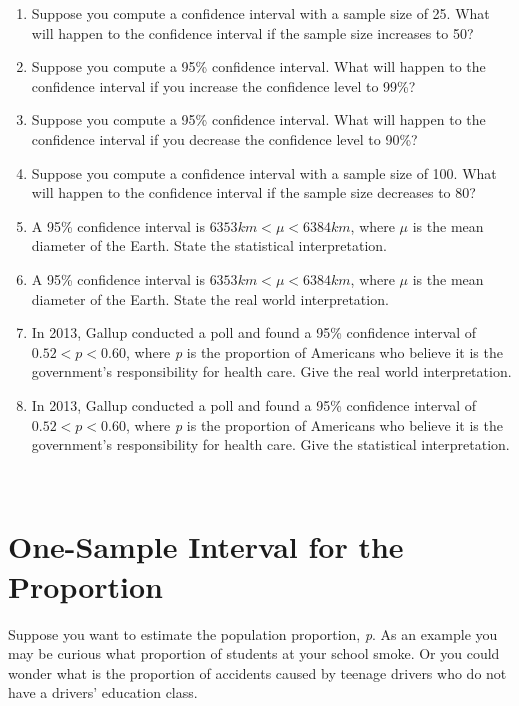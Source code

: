 \documentclass[]{book}
\begin{document}
\begin{enumerate}
\def\labelenumi{\arabic{enumi}.}
\item
  Suppose you compute a confidence interval with a sample size of 25. What will happen to the confidence interval if the sample size increases to 50?
\item
  Suppose you compute a 95\% confidence interval. What will happen to the confidence interval if you increase the confidence level to 99\%?
\item
  Suppose you compute a 95\% confidence interval. What will happen to the confidence interval if you decrease the confidence level to 90\%?
\item
  Suppose you compute a confidence interval with a sample size of 100. What will happen to the confidence interval if the sample size decreases to 80?
\item
  A 95\% confidence interval is \(6353km< \mu<6384km\), where \(\mu\) is the mean diameter of the Earth. State the statistical interpretation.
\item
  A 95\% confidence interval is \(6353 km < \mu < 6384 km\), where \(\mu\) is the mean diameter of the Earth. State the real world interpretation.
\item
  In 2013, Gallup conducted a poll and found a 95\% confidence interval of \(0.52 < p < 0.60\), where \emph{p} is the proportion of Americans who believe it is the government's responsibility for health care. Give the real world interpretation.
\item
  In 2013, Gallup conducted a poll and found a 95\% confidence interval of \(0.52 < p < 0.60\), where \emph{p} is the proportion of Americans who believe it is the government's responsibility for health care. Give the statistical interpretation.
\end{enumerate}

\textbf{~
}

\hypertarget{one-sample-interval-for-the-proportion}{%
\section{One-Sample Interval for the Proportion}\label{one-sample-interval-for-the-proportion}}

Suppose you want to estimate the population proportion, \emph{p}. As an example you may be curious what proportion of students at your school smoke. Or you could wonder what is the proportion of accidents caused by teenage drivers who do not have a drivers' education class.
\end{document}
